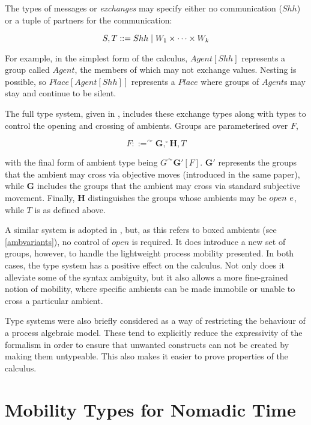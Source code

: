 The types of messages or \emph{exchanges} may specify either no
communication ($Shh$) or a tuple of partners for the communication:

\begin{equation}
S, T ::= Shh \;|\; W_1 \times \dots \times W_k
\end{equation}

\noindent For example, in the simplest form of the calculus,
$Agent[Shh]$ represents a group called $Agent$, the members of which
may not exchange values.  Nesting is possible, so \linebreak $Place[Agent[Shh]]$
represents a $Place$ where groups of $Agent$s may stay and continue to
be silent.

The full type system, given in \cite{ambienttypes}, includes these
exchange types along with types to control the opening and crossing of
ambients.  Groups are parameterised over $F$,

\begin{equation}
F ::= ^\curvearrowright \mathbf{G}, ^\circ \mathbf{H}, T
\end{equation}

\noindent with the final form of ambient type being $G^\curvearrowright
\mathbf{G'}[F]$.  $\mathbf{G'}$ represents the groups that the ambient
may cross via objective moves (introduced in the same paper), while
$\mathbf{G}$ includes the groups that the ambient may cross via standard
subjective movement.  Finally, $\mathbf{H}$ distinguishes the groups
whose ambients may be $open\ e$, while $T$ is as defined above.

A similar system is adopted in \cite{m3}, but, as this refers to boxed
ambients (see \ref{ambvariants}), no control of $open$ is required.  It
does introduce a new set of groups, however, to handle the lightweight
process mobility presented.  In both cases, the type system has a
positive effect on the calculus.  Not only does it alleviate some of
the syntax ambiguity, but it also allows a more fine-grained notion of
mobility, where specific ambients can be made immobile or unable to
cross a particular ambient.

Type systems were also briefly considered as a way of restricting the
behaviour of a process algebraic model.  These tend to explicitly reduce
the expressivity of the formalism in order to ensure that unwanted
constructs can not be created by making them untypeable.  This also
makes it easier to prove properties of the calculus.  

\section{Mobility Types for Nomadic Time}
\label{typesys}

